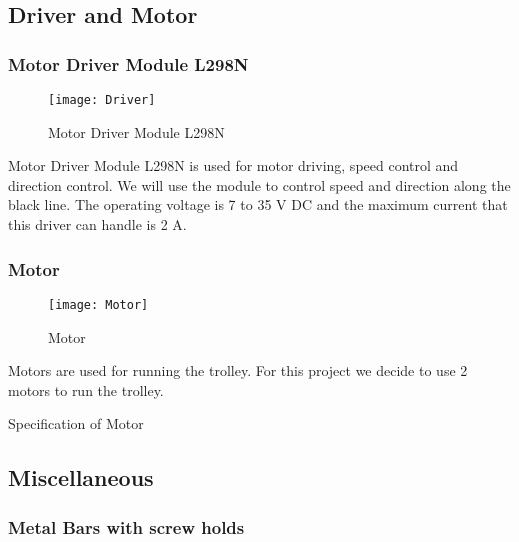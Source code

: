 \documentclass[12pt]{article}
\begin{document}
\newpage 

\subsection{Driver and Motor} \label{sub:drivernmotor}

\subsubsection{Motor Driver Module L298N} \label{subsub:driver}

\begin{figure}[H]
	\centering
	\texttt{[image: Driver]}
	\caption{Motor Driver Module L298N} \label{fig:driver}
\end{figure}

Motor Driver Module L298N is used for motor driving, speed control and direction control. We will use the module to control speed and direction along the black line. The operating voltage is 7 to 35 V DC and the maximum current that this driver can handle is 2 A.

\subsubsection{Motor} \label{subsub:motor}

\begin{figure}[H]
	\centering
	\texttt{[image: Motor]}
	\caption{Motor} \label{fig:motor}
\end{figure}

Motors are used for running the trolley. For this project we decide to use 2 motors to run the trolley.

\begin{table}[H]
	\centering
	\label{tab:motor}
	\caption{Specification of Motor}
\end{table}

\subsection{Miscellaneous} \label{sub:misc}

\subsubsection*{Metal Bars with screw holds} \label{subsub:metal}
\end{document}

